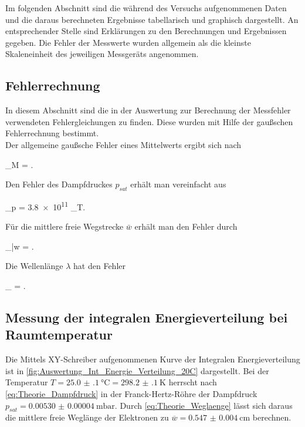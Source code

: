 Im folgenden Abschnitt sind die während des Versuchs aufgenommenen Daten 
und die daraus berechneten Ergebnisse tabellarisch und graphisch dargestellt.
An entsprechender Stelle sind Erklärungen zu den Berechnungen
und Ergebnissen gegeben. Die Fehler der Messwerte wurden allgemein als die 
kleinste Skaleneinheit des jeweiligen Messgeräts angenommen.

\subsection{Fehlerrechnung}\label{sec:Fehlerrechnung}
	
	In diesem Abschnitt sind die in der Auswertung zur Berechnung der
	Messfehler verwendeten Fehlergleichungen zu finden. Diese wurden
	mit Hilfe der gaußschen Fehlerrechnung bestimmt.\\
	
	Der allgemeine gaußsche Fehler eines Mittelwerts ergibt sich nach
	\begin{errorEquation}
		\sigma_{M} =  .
		 \label{std:Mittel}
	\end{errorEquation}
	
	Den Fehler des Dampfdruckes $p_{sat}$ erhält man vereinfacht aus
	\begin{errorEquation}
		\sigma_{p} = \num{3.8e11}  \cdot {} \cdot \sigma_{T}.
	    \label{std:Dampfdruck}
	\end{errorEquation}  
	
	Für die mittlere freie Wegstrecke $\bar{w}$ erhält man den Fehler durch
	\begin{errorEquation}
		\sigma_{\bar{w}} =  .
    \label{std:Wegstrecke}
	\end{errorEquation}  

	Die Wellenlänge $\lambda$ hat den Fehler
	\begin{errorEquation}
		\sigma_{\lambda} =  .
		 \label{std:Wellenlänge}
	\end{errorEquation}  
	

\subsection{Messung der integralen Energieverteilung bei Raumtemperatur}
	
	Die Mittels XY-Schreiber aufgenommenen Kurve der Integralen Energieverteilung ist 
	in \cref{fig:Auswertung_Int_Energie_Verteilung_20C} dargestellt. Bei der Temperatur
	$T =\SI{25.0(1)}{\degreeCelsius} = \SI{298.2(1)}{\kelvin}$ herrscht nach \cref{eq:Theorie_Dampfdruck} in der 
	Franck-Hertz-Röhre der Dampfdruck $p_{sat} = \SI{0.00530(4)}{\milli\bar}$. Durch \cref{eq:Theorie_Weglaenge}
	lässt sich daraus die mittlere freie Weglänge der Elektronen zu $\overline{w} = \SI{0.547(4)}{\cm}$ berechnen.
	
